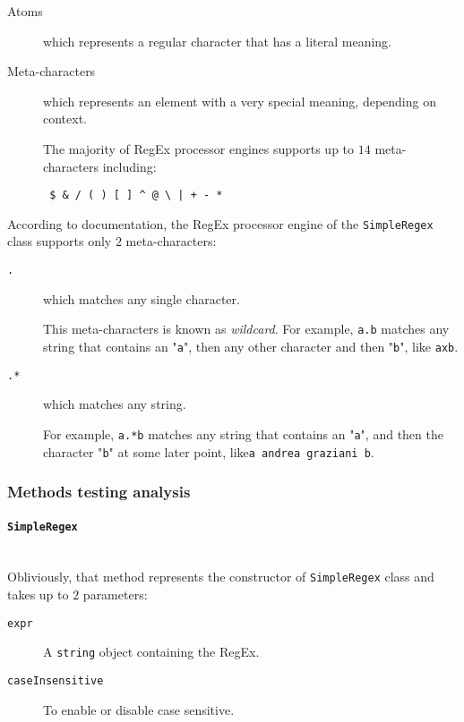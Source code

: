 \documentclass[sigconf]{acmart}
\begin{document}
\begin{description}
\item[Atoms] which represents a regular character that has a literal meaning. 
\item[Meta-characters] which represents an element with a very special meaning, depending on context. 

The majority of RegEx processor engines supports up to $14$ meta-characters including: \begin{verbatim} $ & / ( ) [ ] ^ @ \ | + - *  \end{verbatim} 
\end{description}

According to documentation, the RegEx processor engine of the \texttt{SimpleRegex} class supports only $2$ meta-characters:

\begin{description}
\item[\texttt{.}] which matches any single character.

This meta-characters is known as \textit{wildcard}. For example, \colorbox{beaublue}{\texttt{a.b}} matches any string that contains an "\texttt{a}", then any other character and then "\texttt{b}", like \colorbox{beaublue}{\texttt{axb}}.

\item[\texttt{.*}] which matches any string. 

For example, \colorbox{beaublue}{\texttt{a.*b}} matches any string that contains an "\texttt{a}", and then the character "\texttt{b}" at some later point, like\newline  \colorbox{beaublue}{\texttt{a andrea graziani b}}.
\end{description}

\subsubsection{Methods testing analysis}

\paragraph{\texttt{SimpleRegex}}
\hfill\\
Obliviously, that method represents the constructor of \texttt{SimpleRegex} class and takes up to $2$ parameters:

\begin{description}
\item[\texttt{expr}] A \texttt{string} object containing the RegEx.
\item[\texttt{caseInsensitive}] To enable or disable case sensitive. 
\end{description}
\end{document}
